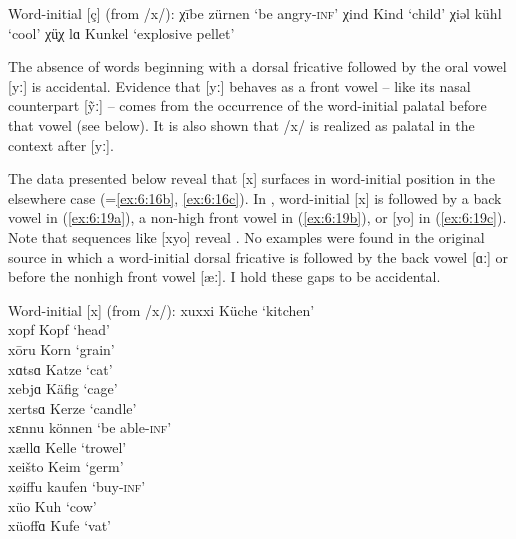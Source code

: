 \ea%
\label{ex:6:18}Word-initial [ç] (from /x/):
\ea\label{ex:6:18a}χībe     \tab [çiːbe]   \tab zürnen  \tab ‘be angry-\textsc{inf}’ 
\ex\label{ex:6:18b}χind     \tab [çind]    \tab Kind    \tab ‘child’                 
\ex\label{ex:6:18c}χiəl     \tab [çiæl]    \tab kühl    \tab ‘cool’                  
\ex\label{ex:6:18d}χü͔χ  lɑ \tab  [çỹːçlɑ] \tab  Kunkel \tab  ‘explosive pellet’     
\z
\z 


The absence of words beginning with a dorsal fricative followed by the oral vowel [yː] is accidental. Evidence that [yː] behaves as a front vowel -- like its nasal counterpart [ỹː] {}-- comes from the occurrence of the word-initial palatal  before that vowel (see below). It is also shown that /x/ is realized as palatal in the context after [yː].

The data presented below reveal that [x] surfaces in word-initial position in the elsewhere case (=\ref{ex:6:16b}, \ref{ex:6:16c}). In , word-initial [x] is followed by a back vowel in (\ref{ex:6:19a}), a non-high front vowel in (\ref{ex:6:19b}), or [yo] in (\ref{ex:6:19c}). Note that sequences like [xyo] reveal  . No examples were found in the original source in which a word-initial dorsal fricative is followed by the back vowel [ɑː] or before the nonhigh front vowel [æː]. I hold these gaps to be accidental.

\ea%
\label{ex:6:19}Word-initial [x] (from /x/):
\ea\label{ex:6:19a}  xuxxi  \tab [xuxxi]    \tab   Küche \tab ‘kitchen’ \\
     xopf   \tab [xopf]     \tab  Kopf   \tab ‘head’    \\
     xōru   \tab [xoːru]    \tab   Korn  \tab ‘grain’   \\
     xɑtsɑ  \tab [xɑtsɑ]    \tab   Katze \tab ‘cat’     \\
\ex\label{ex:6:19b}  xebjɑ  \tab  [xebjɑ]   \tab  Käfig  \tab ‘cage’    \\
     xertsɑ \tab  [xertsɑ]  \tab  Kerze  \tab ‘candle’  \\ 
     xɛnnu  \tab  [xɛnnu]   \tab  können \tab ‘be able\textsc{{}-inf}’ \\
     xællɑ  \tab  [xællɑ]   \tab  Kelle  \tab ‘trowel’                 \\
     xeišto \tab  [xeiʃto]  \tab  Keim   \tab ‘germ’                   \\
     xøiffu \tab   [xøiffu] \tab  kaufen \tab ‘buy\textsc{{}-inf}’ \\
\ex\label{ex:6:19c}  xüo    \tab [xyo]      \tab   Kuh   \tab ‘cow’ \\
     xüoffɑ \tab [xyoffɑ]   \tab  Kufe   \tab ‘vat’  \\
  \z                        
\z 

